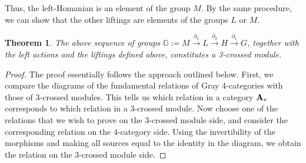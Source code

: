 \documentclass[11pt, reqno]{amsart} %
\newcommand{\bG}{{\mathbb{G}}}
\newtheorem{theorem}{Theorem}[section]
\theoremstyle{definition}
\theoremstyle{remark}
\numberwithin{equation}{section}
\begin{document}
Thus, the left-Homanian is an element of the group $M$. By the same procedure, we can show that the other liftings are elements of the groups $L$ or $M$. 

\begin{theorem}
The above sequence of groups $\bG := M\xrightarrow{\partial_3}L \xrightarrow{\partial_2}H \xrightarrow{\partial_1} G$, together with the left actions and the liftings defined above, constitutes a 3-crossed module.
\end{theorem}
\begin{proof}
The proof essentially follows the approach outlined below. First, we compare the diagrams of the fundamental relations of Gray 4-categories with those of 3-crossed modules. This tells us which relation in a category ${\bf A_*}$ corresponds to which relation in a 3-crossed module. Now choose one of the relations that we wish to prove on the 3-crossed module side, and consider the corresponding relation on the 4-category side. Using the invertibility of the morphisms and making all sources equal to the identity in the diagram, we obtain the relation on the 3-crossed module side.


\end{proof}
\end{document}
